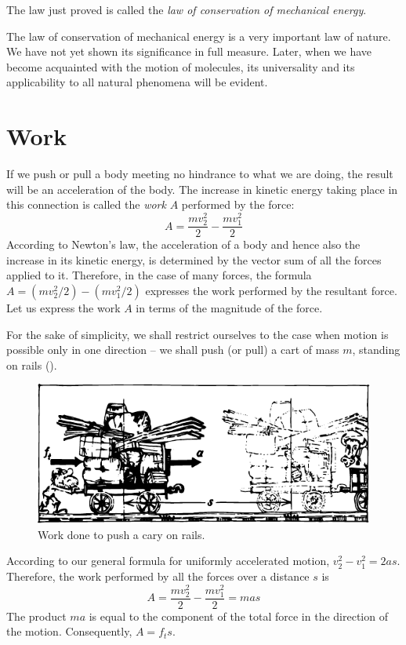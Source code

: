 The law just proved is called the \emph{law of conservation
of mechanical energy}.

The law of conservation of mechanical energy is a very
important law of nature. We have not yet shown its significance in full measure. Later, when we have become acquainted with the motion of molecules, its universality and its applicability to all natural phenomena will be evident.

\section{Work}
If we push or pull a body meeting no hindrance to
what we are doing, the result will be an acceleration of
the body. The increase in kinetic energy taking place in
this connection is called the \emph{work} $A$ performed by the
force:
\begin{equation*}%
A= \frac{mv_{2}^{2}}{2} -  \frac{mv_{1}^{2}}{2}
\end{equation*}
According to Newton's law, the acceleration of a body
and hence also the increase in its kinetic energy, is determined by the vector sum of all the forces applied to it. Therefore, in the case of many forces, the formula $A = (mv_{2}^{2}/2) - (mv_{1}^{2}/2)$ expresses the work performed by the resultant force. Let us express the work $A$ in terms of the magnitude of the force.

For the sake of simplicity, we shall restrict ourselves
to the case when motion is possible only in one direction --
we shall push (or pull) a cart of mass $m$, standing on rails
().
\begin{figure}[!ht]
\centering
\includegraphics[width=\textwidth]{figures/fig-03-06.pdf}
\caption{Work done to push a cary on rails.}
\label{fig-3.06}
\end{figure}

According to our general formula for uniformly accelerated motion, $v_{2}^{2} - v_{1}^{2} = 2as$. Therefore, the work performed by all the forces over a distance $s$ is
\begin{equation*}%
A= \frac{mv_{2}^{2}}{2} -  \frac{mv_{1}^{2}}{2} = mas
\end{equation*}
The product $ma$ is equal to the component of the total
force in the direction of the motion. Consequently, $A =f_{t}s$.

